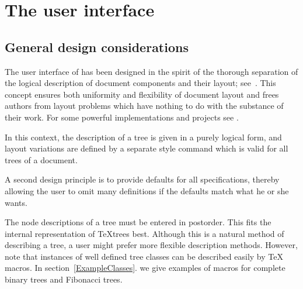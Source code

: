                                                                                 
\section{The user interface}\label{Interface}                                   
                                                                                
\subsection{General design considerations}                                      
                                                                                
The user interface of \TreeTeX{} has been designed in the spirit of             
the thorough separation of the logical description of document components       
and their layout; see~\cite{DocumentFormatting,GML}. This concept               
ensures both uniformity and flexibility of document layout and frees            
authors from layout problems which have nothing to do with the                  
substance of their work. For some powerful implementations and projects         
see \cite{Tables,Karlsruhe,LaTeX,Grif,Scribe}.                                  
                                                                                
In this context, the description of a tree is given in a purely                 
logical form, and layout variations are defined by a separate style             
command which is valid for all trees of a document.                             
                                                                                
A second design principle is to provide defaults for all specifications,        
thereby allowing the user to omit many definitions                              
if the defaults match what he or she wants.                                                        
                                                                                
The node descriptions of a tree must be entered in postorder.                   
This fits the internal representation                                      
of \TeX{}trees best. Although this is a natural method of describing a               
tree, a user might prefer more flexible description methods.                     
However, note that instances of well defined tree classes can be described      
easily by \TeX{} macros. In section~\ref{ExampleClasses}. we give examples of macros                             
for complete binary trees and Fibonacci trees.                                  
                                                                                
